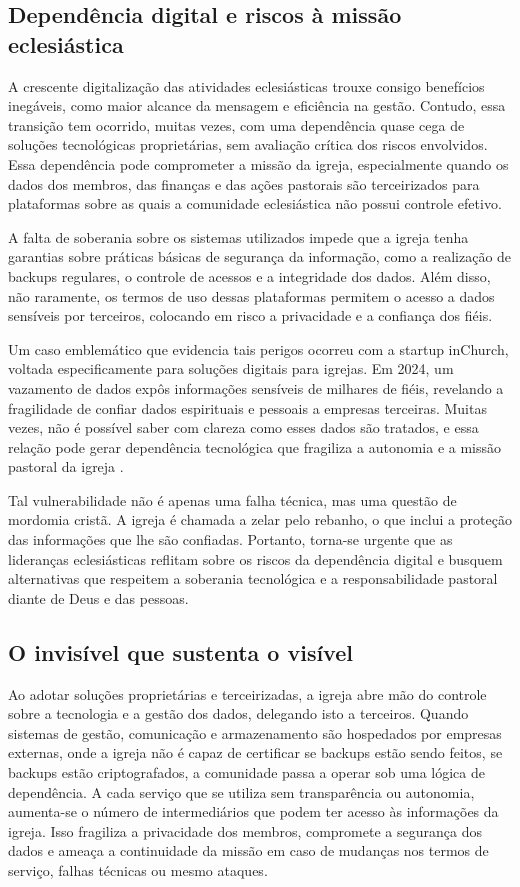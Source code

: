 \subsection{Dependência digital e riscos à missão eclesiástica}

A crescente digitalização das atividades eclesiásticas trouxe consigo benefícios inegáveis, como maior alcance da mensagem e eficiência na gestão. Contudo, essa transição tem ocorrido, muitas vezes, com uma dependência quase cega de soluções tecnológicas proprietárias, sem avaliação crítica dos riscos envolvidos. Essa dependência pode comprometer a missão da igreja, especialmente quando os dados dos membros, das finanças e das ações pastorais são terceirizados para plataformas sobre as quais a comunidade eclesiástica não possui controle efetivo.

A falta de soberania sobre os sistemas utilizados impede que a igreja tenha garantias sobre práticas básicas de segurança da informação, como a realização de backups regulares, o controle de acessos e a integridade dos dados. Além disso, não raramente, os termos de uso dessas plataformas permitem o acesso a dados sensíveis por terceiros, colocando em risco a privacidade e a confiança dos fiéis.

Um caso emblemático que evidencia tais perigos ocorreu com a startup inChurch, voltada especificamente para soluções digitais para igrejas. Em 2024, um vazamento de dados expôs informações sensíveis de milhares de fiéis, revelando a fragilidade de confiar dados espirituais e pessoais a empresas terceiras. Muitas vezes, não é possível saber com clareza como esses dados são tratados, e essa relação pode gerar dependência tecnológica que fragiliza a autonomia e a missão pastoral da igreja \cite{almeida_inchurch_2024}.

Tal vulnerabilidade não é apenas uma falha técnica, mas uma questão de mordomia cristã. A igreja é chamada a zelar pelo rebanho, o que inclui a proteção das informações que lhe são confiadas. Portanto, torna-se urgente que as lideranças eclesiásticas reflitam sobre os riscos da dependência digital e busquem alternativas que respeitem a soberania tecnológica e a responsabilidade pastoral diante de Deus e das pessoas.

\subsection{O invisível que sustenta o visível}

Ao adotar soluções proprietárias e terceirizadas, a igreja abre mão do controle sobre a tecnologia e a gestão dos dados, delegando isto a terceiros. Quando sistemas de gestão, comunicação e armazenamento são hospedados por empresas externas, onde a igreja não é capaz de certificar se backups estão sendo feitos, se backups estão criptografados, a comunidade passa a operar sob uma lógica de dependência. A cada serviço que se utiliza sem transparência ou autonomia, aumenta-se o número de intermediários que podem ter acesso às informações da igreja. Isso fragiliza a privacidade dos membros, compromete a segurança dos dados e ameaça a continuidade da missão em caso de mudanças nos termos de serviço, falhas técnicas ou mesmo ataques.

